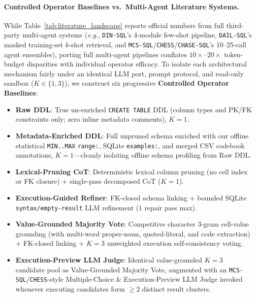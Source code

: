 \documentclass[10pt,twocolumn]{article}
\begin{document}
\paragraph{Controlled Operator Baselines vs.\ Multi-Agent Literature Systems.}
While Table~\ref{tab:literature_landscape} reports official numbers from full third-party multi-agent systems (\emph{e.g.}, \texttt{DIN-SQL}'s 4-module few-shot pipeline, \texttt{DAIL-SQL}'s masked training-set $k$-shot retrieval, and \texttt{MCS-SQL}/\texttt{CHESS}/\texttt{CHASE-SQL}'s 10--25-call agent ensembles), porting full multi-agent pipelines conflates $10\times$--$20\times$ token-budget disparities with individual operator efficacy. To isolate each architectural mechanism fairly under an identical LLM port, prompt protocol, and read-only sandbox ($K \in \{1, 3\}$), we construct six progressive \textbf{Controlled Operator Baselines}:
\begin{itemize}
  \item \textbf{Raw DDL}: True un-enriched \texttt{CREATE TABLE} DDL (column types and PK/FK constraints only; zero inline metadata comments), $K=1$.
  \item \textbf{Metadata-Enriched DDL}: Full unpruned schema enriched with our offline statistical \texttt{MIN..MAX} \texttt{range:}, SQLite \texttt{examples:}, and merged CSV codebook annotations, $K=1$—cleanly isolating offline schema profiling from Raw DDL.
  \item \textbf{Lexical-Pruning CoT}: Deterministic lexical column pruning (no cell index or FK closure) + single-pass decomposed CoT ($K=1$).
  \item \textbf{Execution-Guided Refiner}: FK-closed schema linking + bounded SQLite \texttt{syntax/\allowbreak empty-result} LLM refinement ($1$ repair pass max).
  \item \textbf{Value-Grounded Majority Vote}: Competitive character 3-gram cell-value grounding (with multi-word proper-noun, quoted-literal, and code extraction) + FK-closed linking + $K=3$ unweighted execution self-consistency voting.
  \item \textbf{Execution-Preview LLM Judge}: Identical value-grounded $K=3$ candidate pool as Value-Grounded Majority Vote, augmented with an \texttt{MCS-SQL}/\allowbreak\texttt{CHESS}-style Multiple-Choice \& Execution-Preview LLM Judge invoked whenever executing candidates form $\ge 2$ distinct result clusters.
\end{itemize}
\end{document}
